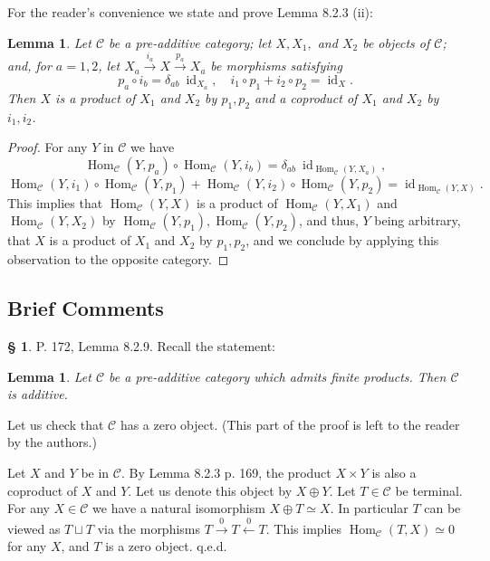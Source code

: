\documentclass[12pt]{article}%
\newtheorem{lem}[thm]{Lemma}
\theoremstyle{remark}
\theoremstyle{definition}
\newtheorem{s}[thm]{\S}%
\newcommand{\C}{\mathcal C}
\newcommand{\xl}{\xleftarrow}
\newcommand{\xr}{\xrightarrow}
\DeclareMathOperator{\id}{id}
\DeclareMathOperator{\Hom}{Hom}%
\begin{document}
For the reader's convenience we state and prove Lemma 8.2.3 (ii):
%
\begin{lem}\label{823ii}
Let $\C$ be a pre-additive category; let $X,X_1,$ and $X_2$ be objects of $\C$; and, for $a=1,2$, let $X_a\xr{i_a}X\xr{p_a}X_a$ be morphisms satisfying 
$$
p_a\circ i_b=\delta_{ab}\ \id_{X_a},\quad i_1\circ p_1+i_2\circ p_2=\id_X.
$$
Then $X$ is a product of $X_1$ and $X_2$ by $p_1,p_2$ and a coproduct of $X_1$ and $X_2$ by $i_1,i_2$. 
\end{lem}
%
\begin{proof}
For any $Y$ in $\C$ we have 
$$
\Hom_\C(Y,p_a)\circ\Hom_\C(Y,i_b)=\delta_{ab}\ \id_{\Hom_\C(Y,X_a)},
$$ 
$$
\Hom_\C(Y,i_1)\circ\Hom_\C(Y,p_1)+\Hom_\C(Y,i_2)\circ\Hom_\C(Y,p_2)=\id_{\Hom_\C(Y,X)}.
$$ 
This implies that $\Hom_\C(Y,X)$ is a product of $\Hom_\C(Y,X_1)$ and $\Hom_\C(Y,X_2)$ by $\Hom_\C(Y,p_1),\Hom_\C(Y,p_2)$, and thus, $Y$ being arbitrary, that $X$ is a product of $X_1$ and $X_2$ by $p_1,p_2$, and we conclude by applying this observation to the opposite category.
\end{proof}


\subsection{Brief Comments}

\begin{s} 
P. 172, Lemma 8.2.9. Recall the statement:
%
\begin{lem}
Let $\C$ be a pre-additive category which admits finite products. Then $\C$ is additive.
\end{lem}
%
Let us check that $\C$ has a zero object. (This part of the proof is left to the reader by the authors.) 

Let $X$ and $Y$ be in $\C$. By Lemma 8.2.3 p. 169, the product $X\times Y$ is also a coproduct of $X$ and $Y$. Let us denote this object by $X\oplus Y$. Let $T\in\C$ be terminal. For any $X\in\C$ we have a natural isomorphism $X\oplus T\simeq X$. In particular $T$ can be viewed as $T\sqcup T$ via the morphisms $T\xr0T\xl0T$. This implies $\Hom_\C(T,X)\simeq0$ for any $X$, and $T$ is a zero object. q.e.d.
\end{s}

%
\end{document}
